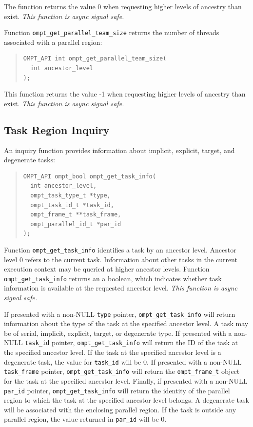 \documentclass{article}
\begin{document}
 The function returns the value 0 when requesting higher levels of
 ancestry than exist.  {\em This function is async signal safe.}
 
 Function \verb|ompt_get_parallel_team_size| returns  
 the number of threads associated with a parallel region:
 
 
\begin{quote}
\begin{verbatim}
OMPT_API int ompt_get_parallel_team_size(
  int ancestor_level
);
\end{verbatim}
\end{quote}

\noindent
 This function returns the value -1 when requesting higher levels of
 ancestry than exist.  {\em This function is async signal safe.}


 
\subsection{Task Region Inquiry}
\label{sec:task-region}

An inquiry function provides information about implicit, explicit, target, and degenerate tasks:

\begin{quote}
\begin{verbatim}
OMPT_API ompt_bool ompt_get_task_info(
  int ancestor_level,
  ompt_task_type_t *type,
  ompt_task_id_t *task_id,
  ompt_frame_t **task_frame,
  ompt_parallel_id_t *par_id
);
\end{verbatim}
\end{quote}

Function \verb|ompt_get_task_info|  identifies a task by an ancestor level. 
Ancestor level 0 refers to the current task. 
Information about other tasks in the current execution context may be queried at higher ancestor levels. 
Function \verb|ompt_get_task_info| returns an a boolean, which indicates whether task information is available at the requested ancestor level.
{\em This function is async signal safe.} 

If presented with a non-NULL \verb|type| pointer, \verb|ompt_get_task_info| will return information about the type of the task at the specified ancestor level. A task may be of  serial, implicit, explicit,  target, or degenerate type. If presented with a non-NULL \verb|task_id| pointer, \verb|ompt_get_task_info| will return the ID of the task at the specified ancestor level. If the task at the specified ancestor level is a degenerate task, the value for \verb|task_id| will be 0. If presented with a non-NULL \verb|task_frame| pointer, \verb|ompt_get_task_info| will return the \verb|ompt_frame_t| object for the task at the specified ancestor level. Finally, if presented with a non-NULL \verb|par_id| pointer, \verb|ompt_get_task_info| will return the identity of the parallel region to which the task at the specified ancestor level belongs. A degenerate task will be associated with the enclosing parallel region. 
If the task is outside any parallel region, the value returned in \verb|par_id| will be 0.
\end{document}
